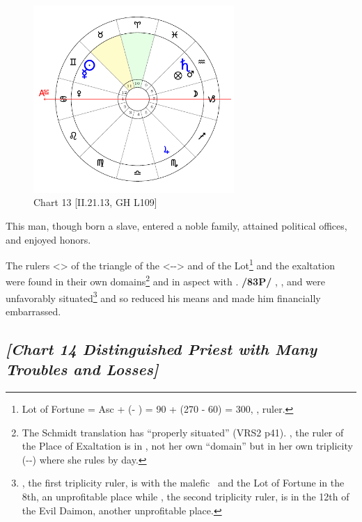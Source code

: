 \clearpage
\begin{figure}
\centering
\vspace{-20pt}
\includegraphics[width=0.68\textwidth]{charts/2_21_13}
\caption{Chart 13 [II.21.13, GH L109]}
\label{fig:chart13}
\end{figure}

This man, though born a slave, entered a noble family, attained political offices, and enjoyed honors. 

The rulers <\Saturn\xspace \Mercury> of the triangle of the \Sun\xspace <\Gemini-\Libra-\Aquarius> and of the Lot\footnote{Lot of Fortune = Asc + (\Moon\xspace\xspace - \Sun) = 90 + (270 - 60) = 300, \Aquarius, \Saturn\xspace ruler.}
 and the exaltation were found in their own domains\footnote{The Schmidt translation has ``properly situated'' (VRS2 p41). \Venus, the ruler of the Place of Exaltation is in \Cancer, not her own ``domain'' but in her own triplicity (\Cancer-\Scorpio-\Pisces) where she rules by day.} and in aspect with \Jupiter. \textbf{/83P/} \Mars, \Saturn, and \Mercury\xspace were unfavorably situated\footnote{\Saturn, the first triplicity ruler, is with the malefic \Mars\, and the Lot of Fortune in the 8th, an unprofitable place while \Mercury, the second triplicity ruler, is in the 12th of the Evil Daimon, another unprofitable place.} and so reduced his means and made
him financially embarrassed.

\newpage
\subsection*{\textit{[Chart 14 Distinguished Priest with Many Troubles and Losses]}}

